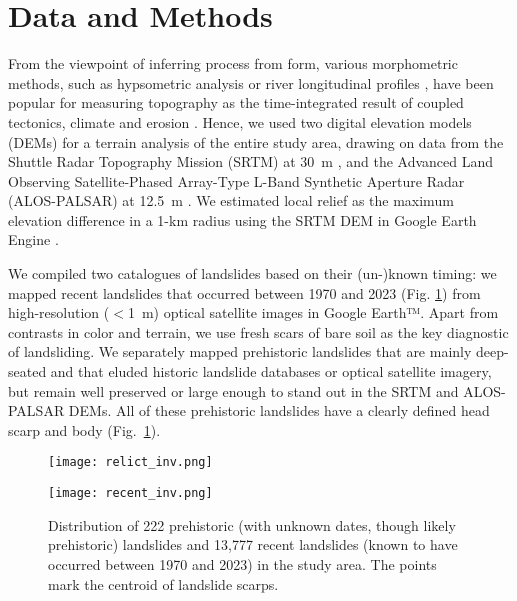 \documentclass[draft]{agujournal2019}
\begin{document}

\section{Data and Methods}
\par From the viewpoint of inferring process from form, various morphometric methods, such as hypsometric analysis \cite{Strahler1952} or river longitudinal profiles \cite{Wobus2006}, have been popular for measuring topography as the time-integrated result of coupled tectonics, climate and erosion \cite{Whittaker2012, Perron2013, Willett2014}. Hence, we used two digital elevation models (DEMs) for a terrain analysis of the entire study area, drawing on data from the Shuttle Radar Topography Mission (SRTM) at 30~m \cite{farr2007}, and the Advanced Land Observing Satellite-Phased Array-Type L-Band Synthetic Aperture Radar (ALOS-PALSAR) at 12.5~m \cite{logan2014}. We estimated local relief as the maximum elevation difference in a 1-km radius using the SRTM DEM in Google Earth Engine \cite{moore2011}. 

\par We compiled two catalogues of landslides based on their (un-)known timing: we mapped recent landslides that occurred between 1970 and 2023 (Fig. \ref{fig:inventory}) from high-resolution ($<$1~m) optical satellite images in Google Earth™. Apart from contrasts in color and terrain, we use fresh scars of bare soil as the key diagnostic of landsliding. We separately mapped prehistoric landslides that are mainly deep-seated and that eluded historic landslide databases or optical satellite imagery, but remain well preserved or large enough to stand out in the SRTM and ALOS-PALSAR DEMs. All of these prehistoric landslides have a clearly defined head scarp and body (Fig.~\ref{fig:inventory}).

\begin{figure}[ht!]
  \begin{minipage}{.48\linewidth}
    \centering
    {\texttt{[image: relict\_inv.png]}}
   \end{minipage}\quad
   \begin{minipage}{.48\linewidth}
    \centering
      {\texttt{[image: recent\_inv.png]}}
  \end{minipage}
    \caption{Distribution of 222 prehistoric (with unknown dates, though likely prehistoric) landslides and 13,777 recent landslides (known to have occurred between 1970 and 2023) in the study area. The points mark the centroid of landslide scarps.}
    \label{fig:inventory}
\end{figure}
\end{document}

